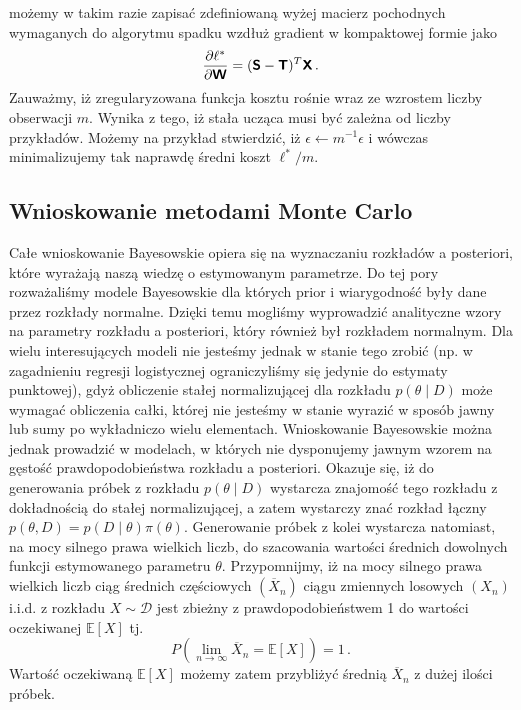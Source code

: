 \documentclass{myclass}
\begin{document}
możemy w takim razie zapisać zdefiniowaną wyżej macierz pochodnych wymaganych do algorytmu spadku
wzdłuż gradient w kompaktowej formie jako
\begin{equation*}
    \pdv{\ell^*}{\boldsymbol{\mathsf{W}}} = (\boldsymbol{\mathsf{S}} - \boldsymbol{\mathsf{T}})^T\boldsymbol{\mathsf{X}}\,.
\end{equation*}
Zauważmy, iż zregularyzowana funkcja kosztu rośnie wraz ze wzrostem liczby obserwacji \(m\). Wynika
z tego, iż stała ucząca musi być zależna od liczby przykładów. Możemy na przykład stwierdzić, iż
\(\epsilon \leftarrow m^{-1}\epsilon\) i wówczas minimalizujemy tak naprawdę średni koszt \(\ell^* /
m\).

\subsection{Wnioskowanie metodami Monte Carlo}

Całe wnioskowanie Bayesowskie opiera się na wyznaczaniu rozkładów a posteriori, które wyrażają naszą
wiedzę o estymowanym parametrze. Do tej pory rozważaliśmy modele Bayesowskie dla których prior i
wiarygodność były dane przez rozkłady normalne. Dzięki temu mogliśmy wyprowadzić analityczne wzory
na parametry rozkładu a posteriori, który również był rozkładem normalnym. Dla wielu interesujących
modeli nie jesteśmy jednak w stanie tego zrobić (np. w zagadnieniu regresji logistycznej
ograniczyliśmy się jedynie do estymaty punktowej), gdyż obliczenie stałej normalizującej dla
rozkładu \(p(\theta \mid D)\) może wymagać obliczenia całki, której nie jesteśmy w stanie wyrazić w
sposób jawny lub sumy po wykładniczo wielu elementach. Wnioskowanie Bayesowskie można jednak
prowadzić w modelach, w których nie dysponujemy jawnym wzorem na gęstość prawdopodobieństwa rozkładu
a posteriori. Okazuje się, iż do generowania próbek z rozkładu \(p(\theta \mid D)\) wystarcza
znajomość tego rozkładu z dokładnością do stałej normalizującej, a zatem wystarczy znać rozkład
łączny \(p(\theta, D) = p(D\mid\theta)\pi(\theta)\). Generowanie próbek z kolei wystarcza natomiast,
na mocy silnego prawa wielkich liczb, do szacowania wartości średnich dowolnych funkcji estymowanego
parametru \(\theta\). Przypomnijmy, iż na mocy silnego prawa wielkich liczb ciąg średnich
częściowych \((\overline{X}_n)\) ciągu zmiennych losowych \((X_n)\) i.i.d. z rozkładu \(X \sim
\mathcal{D}\) jest zbieżny z prawdopodobieństwem 1 do wartości oczekiwanej \(\mathbb{E}[X]\) tj.
\begin{equation*}
    P\left(\lim_{n \to \infty} \overline{X}_n = \mathbb{E}[X]\right) = 1\,.
\end{equation*}
Wartość oczekiwaną \(\mathbb{E}[X]\) możemy zatem przybliżyć średnią \(\overline{X}_n\) z dużej
ilości próbek.
\end{document}
